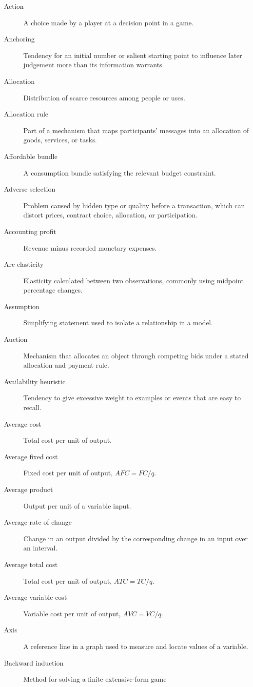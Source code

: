 \begin{description}
  \item[Action] A choice made by a player at a decision point in a game.
  \item[Anchoring] Tendency for an initial number or salient starting point to influence later judgement more than its information warrants.
  \item[Allocation] Distribution of scarce resources among people or uses.
  \item[Allocation rule] Part of a mechanism that maps participants' messages into an allocation of goods, services, or tasks.
  \item[Affordable bundle] A consumption bundle satisfying the relevant budget constraint.
  \item[Adverse selection] Problem caused by hidden type or quality before a
  transaction, which can distort prices, contract choice, allocation, or
  participation.
  \item[Accounting profit] Revenue minus recorded monetary expenses.
  \item[Arc elasticity] Elasticity calculated between two observations, commonly using midpoint percentage changes.
  \item[Assumption] Simplifying statement used to isolate a relationship in a model.
  \item[Auction] Mechanism that allocates an object through competing bids under a stated allocation and payment rule.
  \item[Availability heuristic] Tendency to give excessive weight to examples or events that are easy to recall.
  \item[Average cost] Total cost per unit of output.
  \item[Average fixed cost] Fixed cost per unit of output, $AFC=FC/q$.
  \item[Average product] Output per unit of a variable input.
  \item[Average rate of change] Change in an output divided by the corresponding change in an input over an interval.
  \item[Average total cost] Total cost per unit of output, $ATC=TC/q$.
  \item[Average variable cost] Variable cost per unit of output, $AVC=VC/q$.
  \item[Axis] A reference line in a graph used to measure and locate values of a variable.
  \item[Backward induction] Method for solving a finite extensive-form game

\end{description}
